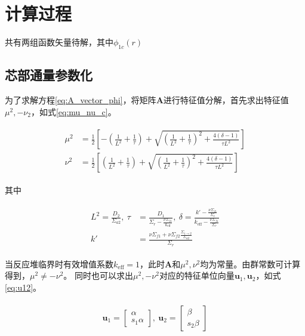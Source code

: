 \section{计算过程}
\label{sec:calculation}

共有两组函数矢量待解，其中$\phi_{1c}(r)$

\subsection{芯部通量参数化}

为了求解方程\ref{eq:A_vector_phi}，将矩阵$\pmb{A}$进行特征值分解，首先求出特征值$\mu^2,-\nu_2$，如式\ref{eq:mu_nu_c}。

\begin{align}
    \label{eq:mu_nu_c}
    \begin{split}
        \mu^2 &= \frac{1}{2}\left[-\left(\frac{1}{L^2}+\frac{1}{\tau}\right)+\sqrt{\left(\frac{1}{L^2}+\frac{1}{\tau}\right)^2+\frac{4(\delta-1)}{\tau L^2}}\right] \\
        \nu^2 &= \frac{1}{2}\left[\left(\frac{1}{L^2}+\frac{1}{\tau}\right)+\sqrt{\left(\frac{1}{L^2}+\frac{1}{\tau}\right)^2+\frac{4(\delta-1)}{\tau L^2}}\right]
    \end{split}
\end{align}

其中

\begin{align}
    \label{eq:L_k_delta}
    \begin{split}
        L^2 = \frac{D_2}{\Sigma_{a2}},\ \tau &= \frac{D_1}{\Sigma_r - \frac{\nu\Sigma_{f1}}{k_\mathrm{eff}}},\ \delta = \frac{k'-\frac{\nu\Sigma_{f1}}{\Sigma_r}}{k_\mathrm{eff}-\frac{\nu\Sigma_{f1}}{\Sigma_r}} \\
        k' &= \frac{\nu\Sigma_{f1}+\nu\Sigma_{f2}\frac{\Sigma_{1\rightarrow 2}}{\Sigma_{a2}}}{\Sigma_r}
    \end{split}
\end{align}

当反应堆临界时有效增值系数$k_\mathrm{eff}=1$，此时$\pmb{A}$和$\mu^2,\nu^2$均为常量。由群常数可计算得到，$\mu^2\neq-\nu^2$。
同时也可以求出$\mu^2,-\nu^2$对应的特征单位向量$\pmb{u}_1,\pmb{u}_2$，如式\ref{eq:u12}。

\begin{align}
    \label{eq:u12}
    \begin{split}
        \pmb{u}_1 = \begin{bmatrix}
            \alpha \\
            s_1\alpha
        \end{bmatrix},\ 
        \pmb{u}_2 = \begin{bmatrix}
            \beta \\
            s_2\beta
        \end{bmatrix}
    \end{split}
\end{align}

